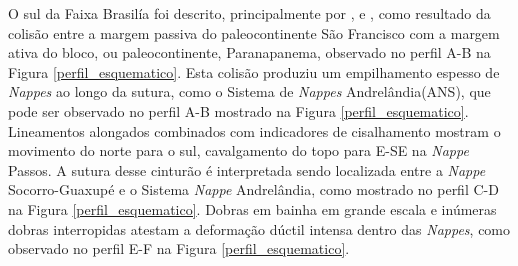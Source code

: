 O sul da Faixa Brasilía foi descrito, principalmente por \cite{pimentel_tectonic_2011}, \cite{reno_situ_2012} e \cite{trouw_new_2013}, como resultado da colisão entre a margem passiva do paleocontinente São Francisco com a margem ativa do bloco, ou paleocontinente, Paranapanema, observado no perfil A-B na Figura \ref{perfil_esquematico}. Esta colisão produziu um empilhamento espesso de \textit{Nappes} ao longo da sutura, como o Sistema de \textit{Nappes} Andrelândia(ANS), que pode ser observado no perfil A-B mostrado na Figura \ref{perfil_esquematico}. Lineamentos alongados combinados com indicadores de cisalhamento mostram o movimento do norte para o sul, cavalgamento do topo para E-SE  na \textit{Nappe} Passos. A sutura desse cinturão é interpretada sendo localizada entre a \textit{Nappe} Socorro-Guaxupé e o Sistema \textit{Nappe} Andrelândia, como mostrado no perfil C-D na Figura \ref{perfil_esquematico}. Dobras em bainha em grande escala e inúmeras dobras interropidas atestam a deformação dúctil intensa dentro das \textit{Nappes}, como observado no perfil E-F na Figura \ref{perfil_esquematico}.

